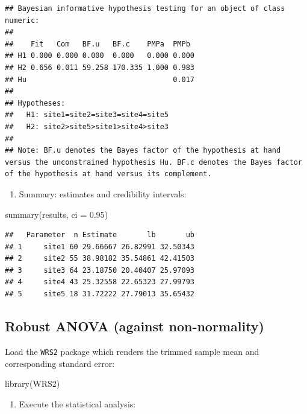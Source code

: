 \documentclass[
]{book}
\newenvironment{Shaded}{\begin{snugshade}}{\end{snugshade}}
\newcommand{\AttributeTok}[1]{\textcolor[rgb]{0.77,0.63,0.00}{#1}}
\newcommand{\FloatTok}[1]{\textcolor[rgb]{0.00,0.00,0.81}{#1}}
\newcommand{\FunctionTok}[1]{\textcolor[rgb]{0.00,0.00,0.00}{#1}}
\newcommand{\NormalTok}[1]{#1}
\providecommand{\tightlist}{%
  \setlength{\itemsep}{0pt}\setlength{\parskip}{0pt}}
\begin{document}
\begin{verbatim}
## Bayesian informative hypothesis testing for an object of class numeric:
## 
##    Fit   Com   BF.u   BF.c    PMPa  PMPb 
## H1 0.000 0.000 0.000  0.000   0.000 0.000
## H2 0.656 0.011 59.258 170.335 1.000 0.983
## Hu                                  0.017
## 
## Hypotheses:
##   H1: site1=site2=site3=site4=site5
##   H2: site2>site5>site1>site4>site3
## 
## Note: BF.u denotes the Bayes factor of the hypothesis at hand versus the unconstrained hypothesis Hu. BF.c denotes the Bayes factor of the hypothesis at hand versus its complement.
\end{verbatim}

\begin{enumerate}
\def\labelenumi{\arabic{enumi})}
\setcounter{enumi}{5}
\tightlist
\item
  Summary: estimates and credibility intervals:
\end{enumerate}

\begin{Shaded}
\begin{Highlighting}[]
\FunctionTok{summary}\NormalTok{(results, }\AttributeTok{ci =} \FloatTok{0.95}\NormalTok{)}
\end{Highlighting}
\end{Shaded}

\begin{verbatim}
##   Parameter  n Estimate       lb       ub
## 1     site1 60 29.66667 26.82991 32.50343
## 2     site2 55 38.98182 35.54861 42.41503
## 3     site3 64 23.18750 20.40407 25.97093
## 4     site4 43 25.32558 22.65323 27.99793
## 5     site5 18 31.72222 27.79013 35.65432
\end{verbatim}

\hypertarget{robust-anova-against-non-normality}{%
\subsection{Robust ANOVA (against non-normality)}\label{robust-anova-against-non-normality}}

Load the \texttt{WRS2} package which renders the trimmed sample mean and
corresponding standard error:

\begin{Shaded}
\begin{Highlighting}[]
\FunctionTok{library}\NormalTok{(WRS2)}
\end{Highlighting}
\end{Shaded}

\begin{enumerate}
\def\labelenumi{\arabic{enumi})}
\tightlist
\item
  Execute the statistical analysis:
\end{enumerate}
\end{document}
